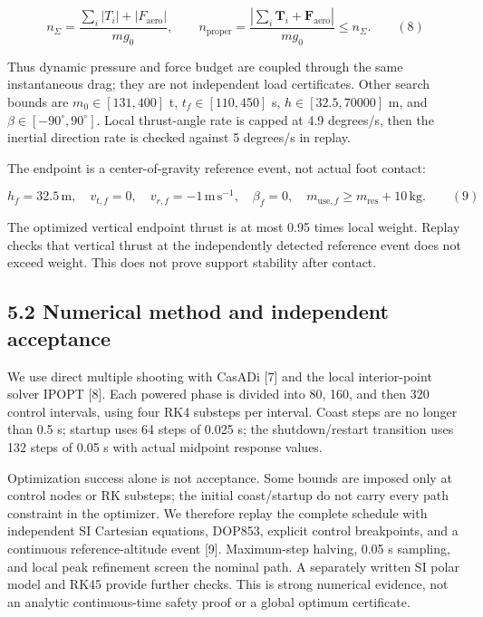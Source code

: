 \documentclass[
  11pt,
  a4paper,
]{article}
\begin{document}
\[ n_\Sigma=\frac{\sum_i|T_i|+|F_{\mathrm{aero}}|}{mg_0},\qquad n_{\mathrm{proper}}=\frac{|\sum_i\mathbf T_i+\mathbf F_{\mathrm{aero}}|}{mg_0}\le n_\Sigma. \qquad (8) \]

Thus dynamic pressure and force budget are coupled through the same
instantaneous drag; they are not independent load certificates. Other
search bounds are \(m_0\in[131,400]\) t, \(t_f\in[110,450]\) s,
\(h\in[32.5,70000]\) m, and \(\beta\in[-90^\circ,90^\circ]\). Local
thrust-angle rate is capped at 4.9 degrees/s, then the inertial
direction rate is checked against 5 degrees/s in replay.

The endpoint is a center-of-gravity reference event, not actual foot
contact:

\[ h_f=32.5\,\mathrm m,\quad v_{t,f}=0,\quad v_{r,f}=-1\,\mathrm{m\,s^{-1}},\quad\beta_f=0,\quad m_{{\mathrm{use}},f}\ge m_{\mathrm{res}}+10\,\mathrm{kg}. \qquad (9) \]

The optimized vertical endpoint thrust is at most 0.95 times local
weight. Replay checks that vertical thrust at the independently detected
reference event does not exceed weight. This does not prove support
stability after contact.

\subsection{5.2 Numerical method and independent
acceptance}\label{numerical-method-and-independent-acceptance}

We use direct multiple shooting with CasADi {[}7{]} and the local
interior-point solver IPOPT {[}8{]}. Each powered phase is divided into
80, 160, and then 320 control intervals, using four RK4 substeps per
interval. Coast steps are no longer than 0.5 s; startup uses 64 steps of
0.025 s; the shutdown/restart transition uses 132 steps of 0.05 s with
actual midpoint response values.

Optimization success alone is not acceptance. Some bounds are imposed
only at control nodes or RK substeps; the initial coast/startup do not
carry every path constraint in the optimizer. We therefore replay the
complete schedule with independent SI Cartesian equations, DOP853,
explicit control breakpoints, and a continuous reference-altitude event
{[}9{]}. Maximum-step halving, 0.05 s sampling, and local peak
refinement screen the nominal path. A separately written SI polar model
and RK45 provide further checks. This is strong numerical evidence, not
an analytic continuous-time safety proof or a global optimum
certificate.
\end{document}

